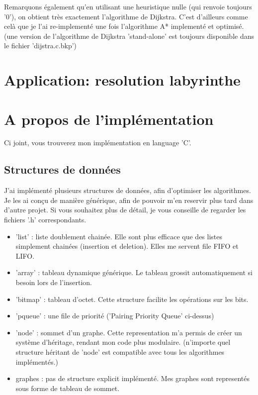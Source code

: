 \documentclass[a4paper,10pt]{article}
\begin{document}
    Remarquons également qu'en utilisant une heuristique nulle (qui renvoie toujours '0'), on obtient très exactement l'algorithme de Dijkstra.
    C'est d'ailleurs comme celà que je l'ai re-implementé une fois l'algorithme A* implementé et optimisé.\newline
    (une version de l'algorithme de Dijkstra 'stand-alone' est toujours disponible dans le fichier 'dijstra.c.bkp')
  \newpage
  \section{Application: resolution labyrinthe}
  
  \newpage
  \section{A propos de l'implémentation}
    Ci joint, vous trouverez mon implémentation en language 'C'.
    \subsection{Structures de données}
      J'ai implémenté plusieurs structures de données, afin d'optimiser les algorithmes. Je les ai conçu de manière générique,
      afin de pouvoir m'en reservir plus tard dans d'autre projet. Si vous souhaitez plus de détail, je vous
      conseille de regarder les fichiers '.h' correspondants.
      \begin{itemize}[label=-]
	\item 'list'   : liste doublement chainée. Elle sont plus efficace que des listes simplement chainées (insertion et deletion).
			Elles me servent file FIFO et LIFO.
	\item 'array'  : tableau dynamique générique. Le tableau grossit automatiquement si besoin lors de l'insertion.
	\item 'bitmap' : tableau d'octet. Cette structure facilite les opérations sur les bits.
	\item 'pqueue' : une file de priorité ('Pairing Priority Queue' ci-dessus)
	\item 'node'   : sommet d'un graphe. Cette representation m'a permis de créer un système d'héritage,
			rendant mon code plus modulaire. (n'importe quel structure héritant de 'node'
			est compatible avec tous les algorithmes implémentés.)
	\item graphes  : pas de structure explicit implémenté. Mes graphes sont representés sous forme de tableau de sommet.
      \end{itemize}
      
\end{document}
